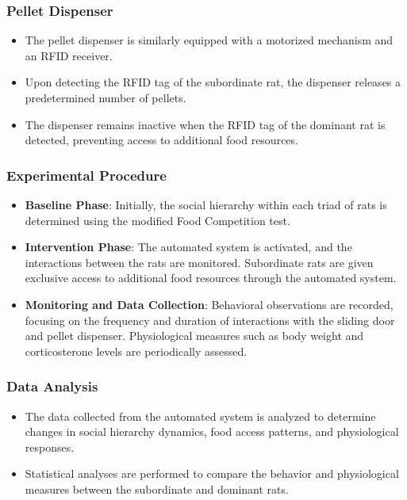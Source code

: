 \documentclass[english, a4paper, 11pt]{article}
\begin{document}
\subsubsection*{Pellet Dispenser}
\begin{itemize}
    \item The pellet dispenser is similarly equipped with a motorized mechanism and an RFID receiver.
    \item Upon detecting the RFID tag of the subordinate rat, the dispenser releases a predetermined number of pellets.
    \item The dispenser remains inactive when the RFID tag of the dominant rat is detected, preventing access to additional food resources.
\end{itemize}

\subsubsection*{Experimental Procedure}
\begin{itemize}
    \item \textbf{Baseline Phase}: Initially, the social hierarchy within each triad of rats is determined using the modified Food Competition test.
    \item \textbf{Intervention Phase}: The automated system is activated, and the interactions between the rats are monitored. Subordinate rats are given exclusive access to additional food resources through the automated system.
    \item \textbf{Monitoring and Data Collection}: Behavioral observations are recorded, focusing on the frequency and duration of interactions with the sliding door and pellet dispenser. Physiological measures such as body weight and corticosterone levels are periodically assessed.
\end{itemize}

\subsubsection*{Data Analysis}
\begin{itemize}
    \item The data collected from the automated system is analyzed to determine changes in social hierarchy dynamics, food access patterns, and physiological responses.
    \item Statistical analyses are performed to compare the behavior and physiological measures between the subordinate and dominant rats.
\end{itemize}
\end{document}
